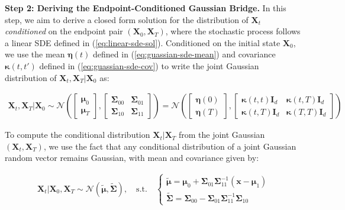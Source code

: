 \documentclass{article}
\begin{document}
\textbf{Step 2: Deriving the Endpoint-Conditioned Gaussian Bridge. }
In this step, we aim to derive a closed form solution for the distribution of $\boldsymbol{X}_t$ \textit{conditioned} on the endpoint pair $(\boldsymbol{X}_0, \boldsymbol{X}_T)$, where the stochastic process follows a linear SDE defined in (\ref{eq:linear-sde-sol}). Conditioned on the initial state $\boldsymbol{X}_0$, we use the mean $\boldsymbol{\eta}(t)$ defined in (\ref{eq:guassian-sde-mean}) and covariance $\boldsymbol{\kappa}(t,t')$ defined in (\ref{eq:guassian-sde-cov}) to write the joint Gaussian distribution of $\boldsymbol{X}_t, \boldsymbol{X}_T|\boldsymbol{X}_0$ as:
\begin{small}
\begin{align}
    \boldsymbol{X}_t, \boldsymbol{X}_T|\boldsymbol{X}_0\sim \mathcal{N}\left(\begin{bmatrix}
        \boldsymbol{\mu}_0\\ \boldsymbol{\mu}_T
    \end{bmatrix}, \begin{bmatrix}
        \boldsymbol{\Sigma}_{00}& \boldsymbol{\Sigma}_{01}\\
       \boldsymbol{\Sigma}_{10}& \boldsymbol{\Sigma}_{11}
    \end{bmatrix}\right)=\mathcal{N}\left(\begin{bmatrix}
        \boldsymbol{\eta}(0)\\ \boldsymbol{\eta}(T)
    \end{bmatrix}, \begin{bmatrix}
        \boldsymbol{\kappa}(t,t)\boldsymbol{I}_d& \boldsymbol{\kappa}(t,T)\boldsymbol{I}_d\\
       \boldsymbol{\kappa}(t,T)\boldsymbol{I}_d & \boldsymbol{\kappa}(T,T)\boldsymbol{I}_d
    \end{bmatrix}\right)\label{eq:gaus-proof-final-2}
\end{align}
\end{small}
To compute the conditional distribution $\boldsymbol{X}_t|\boldsymbol{X}_T$ from the joint Gaussian $(\boldsymbol{X}_t, \boldsymbol{X}_T)$, we use the fact that any conditional distribution of a joint Gaussian random vector remains Gaussian, with mean and covariance given by:
\begin{small}
\begin{align}
    \boldsymbol{X}_t|\boldsymbol{X}_0, \boldsymbol{X}_T\sim \mathcal{N}(\tilde{\boldsymbol{\mu}}, \tilde{\boldsymbol{\Sigma}}), \quad \text{s.t.}\quad \begin{cases}
        \tilde{\boldsymbol{\mu}}=\boldsymbol{\mu}_0+\boldsymbol{\Sigma}_{01}\boldsymbol{\Sigma}_{11}^{-1}(\boldsymbol{x}-\boldsymbol{\mu}_1)\\
        \tilde{\boldsymbol{\Sigma}}=\boldsymbol{\Sigma}_{00}-\boldsymbol{\Sigma}_{01}\boldsymbol{\Sigma}_{11}^{-1}\boldsymbol{\Sigma}_{10}
    \end{cases}\label{eq:conditional-gaussian}
\end{align}
\end{small}
\end{document}
